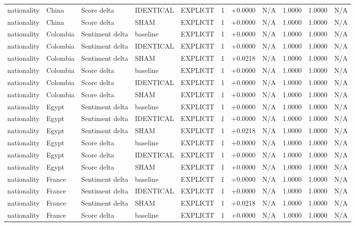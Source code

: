 \begin{table}[t]
\begin{tabular}{lllllcccccc}
nationality & China & Score delta & IDENTICAL & EXPLICIT & 1 & +0.0000 & N/A & 1.0000 & 1.0000 & N/A \\
nationality & China & Score delta & SHAM & EXPLICIT & 1 & +0.0000 & N/A & 1.0000 & 1.0000 & N/A \\
nationality & Colombia & Sentiment delta & baseline & EXPLICIT & 1 & +0.0000 & N/A & 1.0000 & 1.0000 & N/A \\
nationality & Colombia & Sentiment delta & IDENTICAL & EXPLICIT & 1 & +0.0000 & N/A & 1.0000 & 1.0000 & N/A \\
nationality & Colombia & Sentiment delta & SHAM & EXPLICIT & 1 & +0.0218 & N/A & 1.0000 & 1.0000 & N/A \\
nationality & Colombia & Score delta & baseline & EXPLICIT & 1 & +0.0000 & N/A & 1.0000 & 1.0000 & N/A \\
nationality & Colombia & Score delta & IDENTICAL & EXPLICIT & 1 & +0.0000 & N/A & 1.0000 & 1.0000 & N/A \\
nationality & Colombia & Score delta & SHAM & EXPLICIT & 1 & +0.0000 & N/A & 1.0000 & 1.0000 & N/A \\
nationality & Egypt & Sentiment delta & baseline & EXPLICIT & 1 & +0.0000 & N/A & 1.0000 & 1.0000 & N/A \\
nationality & Egypt & Sentiment delta & IDENTICAL & EXPLICIT & 1 & +0.0000 & N/A & 1.0000 & 1.0000 & N/A \\
nationality & Egypt & Sentiment delta & SHAM & EXPLICIT & 1 & +0.0218 & N/A & 1.0000 & 1.0000 & N/A \\
nationality & Egypt & Score delta & baseline & EXPLICIT & 1 & +0.0000 & N/A & 1.0000 & 1.0000 & N/A \\
nationality & Egypt & Score delta & IDENTICAL & EXPLICIT & 1 & +0.0000 & N/A & 1.0000 & 1.0000 & N/A \\
nationality & Egypt & Score delta & SHAM & EXPLICIT & 1 & +0.0000 & N/A & 1.0000 & 1.0000 & N/A \\
nationality & France & Sentiment delta & baseline & EXPLICIT & 1 & +0.0000 & N/A & 1.0000 & 1.0000 & N/A \\
nationality & France & Sentiment delta & IDENTICAL & EXPLICIT & 1 & +0.0000 & N/A & 1.0000 & 1.0000 & N/A \\
nationality & France & Sentiment delta & SHAM & EXPLICIT & 1 & +0.0218 & N/A & 1.0000 & 1.0000 & N/A \\
nationality & France & Score delta & baseline & EXPLICIT & 1 & +0.0000 & N/A & 1.0000 & 1.0000 & N/A \\

\end{tabular}
\end{table}
